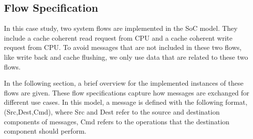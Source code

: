 \documentclass[conference]{IEEEtran}
\begin{document}
\subsection{Flow Specification}

In this case study, two system flows are implemented in the SoC model. They include a cache coherent read request from CPU and a cache coherent write request from CPU.  To avoid messages that are not included in these two flows, like write back and cache flushing, we only use data that are related to these two flows.


In the following section, a brief overview for the implemented instances of these flows are given. These flow specifications capture how messages are exchanged for different use cases. In this model, a message is defined with the following format, (Src,Dest,Cmd), where Src and Dest refer to the source and destination components of messages, Cmd refers to the operations that the destination component should perform. 
\end{document}
